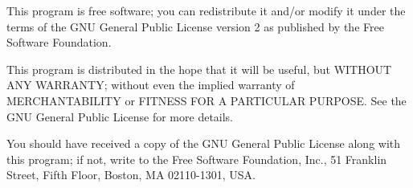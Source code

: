 \documentclass[10pt,a4paper]{article}
\begin{document}
This program is free software; you can redistribute it 
and/or modify it under the terms of the GNU General Public 
License version 2 as published by the Free Software Foundation.

This program is distributed in the hope that it will be 
useful, but WITHOUT ANY WARRANTY; without even the implied 
warranty of MERCHANTABILITY or FITNESS FOR A PARTICULAR 
PURPOSE.  See the GNU General Public License for more 
details.

You should have received a copy of the GNU General Public 
License along with this program; if not, write to the Free 
Software Foundation, Inc., 51 Franklin Street, Fifth Floor, 
Boston, MA  02110-1301, USA.
\end{document}

